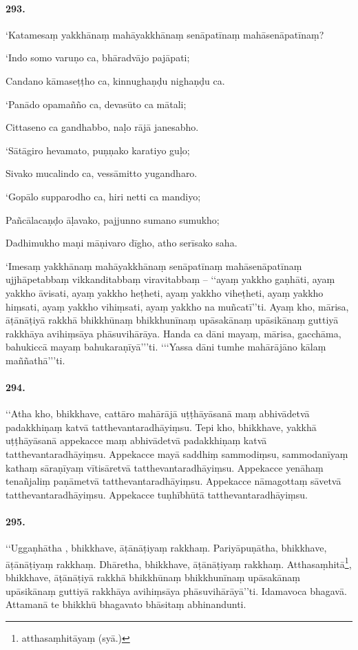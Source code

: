 \paragraph{293.} ‘Katamesaṃ yakkhānaṃ mahāyakkhānaṃ senāpatīnaṃ mahāsenāpatīnaṃ?

‘Indo somo varuṇo ca, bhāradvājo pajāpati;

Candano kāmaseṭṭho ca, kinnughaṇḍu nighaṇḍu ca.

‘Panādo opamañño ca, devasūto ca mātali;

Cittaseno ca gandhabbo, naḷo rājā janesabho.

‘Sātāgiro hevamato, puṇṇako karatiyo guḷo;

Sivako mucalindo ca, vessāmitto yugandharo.

‘Gopālo supparodho ca, hiri netti ca mandiyo;

Pañcālacaṇḍo āḷavako, pajjunno sumano sumukho;

Dadhimukho maṇi māṇivaro dīgho, atho serīsako saha.

‘Imesaṃ yakkhānaṃ mahāyakkhānaṃ senāpatīnaṃ mahāsenāpatīnaṃ ujjhāpetabbaṃ vikkanditabbaṃ viravitabbaṃ – ‘‘ayaṃ yakkho gaṇhāti, ayaṃ yakkho āvisati, ayaṃ yakkho heṭheti, ayaṃ yakkho viheṭheti, ayaṃ yakkho hiṃsati, ayaṃ yakkho vihiṃsati, ayaṃ yakkho na muñcatī’’ti. Ayaṃ kho, mārisa, āṭānāṭiyā rakkhā bhikkhūnaṃ bhikkhunīnaṃ upāsakānaṃ upāsikānaṃ guttiyā rakkhāya avihiṃsāya phāsuvihārāya. Handa ca dāni mayaṃ, mārisa, gacchāma, bahukiccā mayaṃ bahukaraṇīyā’’’ti. ‘‘‘Yassa dāni tumhe mahārājāno kālaṃ maññathā’’’ti.

\paragraph{294.} ‘‘Atha kho, bhikkhave, cattāro mahārājā uṭṭhāyāsanā maṃ abhivādetvā padakkhiṇaṃ katvā tatthevantaradhāyiṃsu. Tepi kho, bhikkhave, yakkhā uṭṭhāyāsanā appekacce maṃ abhivādetvā padakkhiṇaṃ katvā tatthevantaradhāyiṃsu. Appekacce mayā saddhiṃ sammodiṃsu, sammodanīyaṃ kathaṃ sāraṇīyaṃ vītisāretvā tatthevantaradhāyiṃsu. Appekacce yenāhaṃ tenañjaliṃ paṇāmetvā tatthevantaradhāyiṃsu. Appekacce nāmagottaṃ sāvetvā tatthevantaradhāyiṃsu. Appekacce tuṇhībhūtā tatthevantaradhāyiṃsu.

\paragraph{295.} ‘‘Uggaṇhātha , bhikkhave, āṭānāṭiyaṃ rakkhaṃ. Pariyāpuṇātha, bhikkhave, āṭānāṭiyaṃ rakkhaṃ. Dhāretha, bhikkhave, āṭānāṭiyaṃ rakkhaṃ. Atthasaṃhitā\footnote{atthasaṃhitāyaṃ (syā.)}, bhikkhave, āṭānāṭiyā rakkhā bhikkhūnaṃ bhikkhunīnaṃ upāsakānaṃ upāsikānaṃ guttiyā rakkhāya avihiṃsāya phāsuvihārāyā’’ti. Idamavoca bhagavā. Attamanā te bhikkhū bhagavato bhāsitaṃ abhinandunti.

